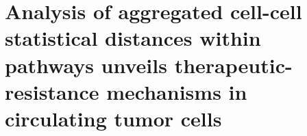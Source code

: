 \chapter{Analysis of aggregated cell-cell statistical distances within pathways unveils therapeutic-resistance mechanisms in circulating tumor cells}

